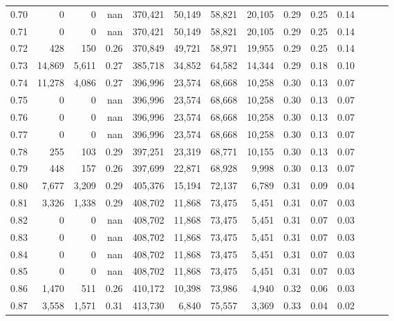 \begin{tabular}{rrrrrrrrrrrrrr}
0.70 &       0 &      0 &   nan &  370,421 &   50,149 &  58,821 &  20,105 &  0.29 &  0.25 &      0.14 \\
0.71 &       0 &      0 &   nan &  370,421 &   50,149 &  58,821 &  20,105 &  0.29 &  0.25 &      0.14 \\
0.72 &     428 &    150 &  0.26 &  370,849 &   49,721 &  58,971 &  19,955 &  0.29 &  0.25 &      0.14 \\
0.73 &  14,869 &  5,611 &  0.27 &  385,718 &   34,852 &  64,582 &  14,344 &  0.29 &  0.18 &      0.10 \\
0.74 &  11,278 &  4,086 &  0.27 &  396,996 &   23,574 &  68,668 &  10,258 &  0.30 &  0.13 &      0.07 \\
0.75 &       0 &      0 &   nan &  396,996 &   23,574 &  68,668 &  10,258 &  0.30 &  0.13 &      0.07 \\
0.76 &       0 &      0 &   nan &  396,996 &   23,574 &  68,668 &  10,258 &  0.30 &  0.13 &      0.07 \\
0.77 &       0 &      0 &   nan &  396,996 &   23,574 &  68,668 &  10,258 &  0.30 &  0.13 &      0.07 \\
0.78 &     255 &    103 &  0.29 &  397,251 &   23,319 &  68,771 &  10,155 &  0.30 &  0.13 &      0.07 \\
0.79 &     448 &    157 &  0.26 &  397,699 &   22,871 &  68,928 &   9,998 &  0.30 &  0.13 &      0.07 \\
0.80 &   7,677 &  3,209 &  0.29 &  405,376 &   15,194 &  72,137 &   6,789 &  0.31 &  0.09 &      0.04 \\
0.81 &   3,326 &  1,338 &  0.29 &  408,702 &   11,868 &  73,475 &   5,451 &  0.31 &  0.07 &      0.03 \\
0.82 &       0 &      0 &   nan &  408,702 &   11,868 &  73,475 &   5,451 &  0.31 &  0.07 &      0.03 \\
0.83 &       0 &      0 &   nan &  408,702 &   11,868 &  73,475 &   5,451 &  0.31 &  0.07 &      0.03 \\
0.84 &       0 &      0 &   nan &  408,702 &   11,868 &  73,475 &   5,451 &  0.31 &  0.07 &      0.03 \\
0.85 &       0 &      0 &   nan &  408,702 &   11,868 &  73,475 &   5,451 &  0.31 &  0.07 &      0.03 \\
0.86 &   1,470 &    511 &  0.26 &  410,172 &   10,398 &  73,986 &   4,940 &  0.32 &  0.06 &      0.03 \\
0.87 &   3,558 &  1,571 &  0.31 &  413,730 &    6,840 &  75,557 &   3,369 &  0.33 &  0.04 &      0.02 \\

\end{tabular}
